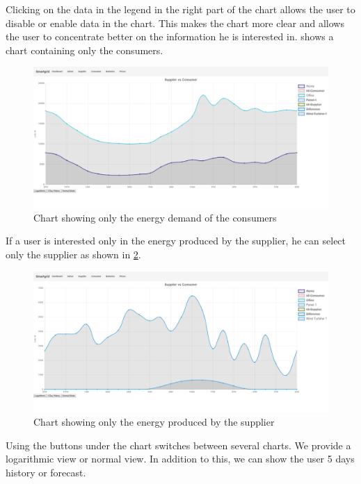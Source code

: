 Clicking on the data in the legend in the right part of the chart allows the user to disable or enable data in the chart.
This makes the chart more clear and allows the user to concentrate better on the information he is interested in.
 shows a chart containing only the consumers.

\begin{figure}[!h]
    \centering
\includegraphics[width=1.00\textwidth]{../figures/ConsumerStacked.png}
    \caption{Chart showing only the energy demand of the consumers}
    \label{fig:consumerChart}
\end{figure}

If a user is interested only in the energy produced by the supplier, he can select only the supplier as shown in \cref{fig:supplierChart}.

\begin{figure}[!h]
    \centering
\includegraphics[width=1.00\textwidth]{../figures/SupplierStacked.png}
    \caption{Chart showing only the energy produced by the supplier}
    \label{fig:supplierChart}
\end{figure}

Using the buttons under the chart switches between several charts.
We provide a logarithmic view or normal view.
In addition to this, we can show the user 5 days history or forecast.

